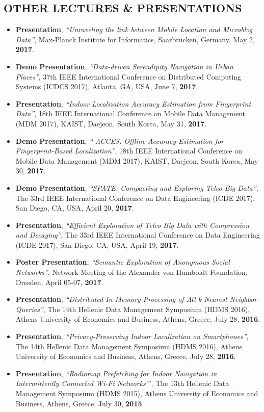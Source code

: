 \documentclass[10pt]{article}
\begin{document}
\subsection*{\bf OTHER LECTURES \& PRESENTATIONS}
\begin{itemize}
\item {\bf Presentation}, {\em ``Unraveling the link between Mobile Location and Microblog Data''}, Max-Planck Institute for Informatics, Saarbr\"ucken, Germany, May 2, {\bf 2017}.
\item  {\bf Demo Presentation}, {\em ``Data-driven Serendipity Navigation in Urban Places''}, 37th IEEE International Conference on Distributed Computing Systems (ICDCS 2017), Atlanta, GA, USA, June 7, {\bf 2017}.
\item  {\bf Presentation}, {\em ``Indoor Localization Accuracy Estimation from Fingerprint Data''}, 18th IEEE International Conference on Mobile Data Management (MDM 2017), KAIST, Daejeon, South Korea, May 31, {\bf 2017}.
\item  {\bf Demo Presentation}, {\em `` ACCES: Offline Accuracy Estimation for Fingerprint-Based Localization''}, 18th IEEE International Conference on Mobile Data Management (MDM 2017), KAIST, Daejeon, South Korea, May 30, {\bf 2017}.
\item  {\bf Demo Presentation}, {\em ``SPATE: Compacting and Exploring Telco Big Data''}, The 33rd IEEE International Conference on Data Engineering (ICDE 2017), San Diego, CA, USA, April 20, {\bf 2017}.
\item  {\bf Presentation}, {\em ``Efficient Exploration of Telco Big Data with Compression and Decaying''}, The 33rd IEEE International Conference on Data Engineering (ICDE 2017), San Diego, CA, USA, April 19, {\bf 2017}.
\item  {\bf Poster Presentation}, {\em ``Semantic Exploration of Anonymous Social Networks''}, Network Meeting of the Alexander von Humboldt Foundation, Dresden, April 05-07, {\bf 2017}.
\item  {\bf Presentation}, {\em ``Distributed In-Memory Processing of All k Nearest Neighbor Queries''}, The 14th Hellenic Data Management Symposium (HDMS 2016), Athens University of Economics and Business, Athens, Greece, July 28, {\bf 2016}.
\item  {\bf Presentation}, {\em ``Privacy-Preserving Indoor Localization on Smartphones''}, The 14th Hellenic Data Management Symposium (HDMS 2016), Athens University of Economics and Business, Athens, Greece, July 28, {\bf 2016}.
\item {\bf Presentation}, {\em ``Radiomap Prefetching for Indoor Navigation in Intermittently Connected Wi-Fi Networks''}', The 13th Hellenic Data Management Symposium (HDMS 2015), Athens University of Economics and Business, Athens, Greece, July 30, {\bf 2015}.

\end{itemize}
\end{document}
